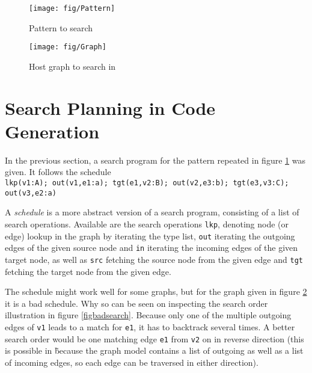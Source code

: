 \begin{figure}[htbp]
  \centering
  \texttt{[image: fig/Pattern]}
  \caption{Pattern to search}
  \label{figpatterntosearch}
\end{figure}

\begin{figure}[htbp]
  \centering
  \texttt{[image: fig/Graph]}
  \caption{Host graph to search in}
  \label{figgraphtosearchin}
\end{figure}


\section{Search Planning in Code Generation}
\label{searchplanning}

In the previous section, a search program for the pattern repeated in figure \ref{figpatterntosearch} was given.
It follows the schedule\\
\texttt{lkp(v1:A); out(v1,e1:a); tgt(e1,v2:B); out(v2,e3:b); tgt(e3,v3:C); out(v3,e2:a)}

A \emph{schedule} is a more abstract version of a search program, consisting of a list of search operations.
Available are the search operations \texttt{lkp}, denoting node (or edge) lookup in the graph by iterating the type list, 
\texttt{out} iterating the outgoing edges of the given source node and \texttt{in} iterating the incoming edges of the given target node,
as well as \texttt{src} fetching the source node from the given edge and \texttt{tgt} fetching the target node from the given edge.

The schedule might work well for some graphs, but for the graph given in figure \ref{figgraphtosearchin} it is a bad schedule.
Why so can be seen on inspecting the search order illustration in figure \ref{figbadsearch}.
Because only one of the multiple outgoing edges of \texttt{v1} leads to a match for \texttt{e1}, it has to backtrack several times.
A better search order would be one matching edge \texttt{e1} from \texttt{v2} on in reverse direction 
(this is possible in \GrG\~ because the graph model contains a list of outgoing as well as a list of incoming edges, so each edge can be traversed in either direction).


